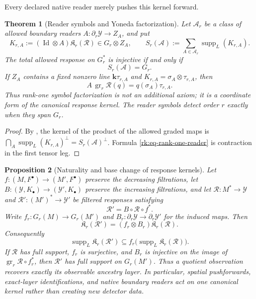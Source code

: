 \documentclass[10pt,reqno]{amsart}
\theoremstyle{plain}
\newtheorem{theorem}{Theorem}[section]
\newtheorem{proposition}[theorem]{Proposition}
\theoremstyle{definition}
\theoremstyle{remark}
\begin{document}
Every declared native reader merely pushes this kernel forward.

\begin{theorem}[Reader symbols and Yoneda factorization]
\label{rk:thm-reader-symbols}
Let $\mathscr A_r$ be a class of allowed boundary readers
$A:\partial_r\mathcal Y\to Z_A$, and put
\[
 K_{r,A}:=(\operatorname{Id}\otimes A)\mathfrak K_r(\mathcal R)
 \in G_r\otimes Z_A,
 \qquad
 S_r(\mathscr A):=
 \sum_{A\in\mathscr A_r}\operatorname{supp}_L(K_{r,A}).
\]
The total allowed response on $G_r^*$ is injective if and only if
\begin{equation}
 S_r(\mathscr A)=G_r.
 \label{rk:eq-reader-support}
\end{equation}
If $Z_A$ contains a fixed nonzero line $\mathbf k\tau_{r,A}$ and
$K_{r,A}=\sigma_A\otimes\tau_{r,A}$, then
\begin{equation}
 A\,\operatorname{gr}_r\mathcal R(q)
 =q(\sigma_A)\tau_{r,A}.
 \label{rk:eq-rank-one-reader}
\end{equation}
Thus rank-one symbol factorization is not an additional axiom; it is a
coordinate form of the canonical response kernel.  The reader symbols detect
order $r$ exactly when they span $G_r$.
\end{theorem}

\begin{proof}
By , the kernel of the product of the allowed
graded maps is
$\bigcap_A\operatorname{supp}_L(K_{r,A})^\perp
=S_r(\mathscr A)^\perp$.  Formula \eqref{rk:eq-rank-one-reader} is contraction
in the first tensor leg.
\end{proof}

\begin{proposition}[Naturality and base change of response kernels]
\label{rk:prop-kernel-naturality}
Let $f:(M,F^\bullet)\to(M',F^\bullet)$ preserve the decreasing
filtrations, let
$B:(\mathcal Y,K_\bullet)\to(\mathcal Y',K_\bullet)$ preserve the
increasing filtrations, and let
$\mathcal R:M^*\to\mathcal Y$ and
$\mathcal R':(M')^*\to\mathcal Y'$ be filtered responses satisfying
\begin{equation}
 \mathcal R'=B\circ\mathcal R\circ f^*.
 \label{rk:eq-response-base-change}
\end{equation}
Write $f_r:G_r(M)\to G_r(M')$ and
$B_r:\partial_r\mathcal Y\to\partial_r\mathcal Y'$ for the induced
maps.  Then
\begin{equation}
 \mathfrak K_r(\mathcal R')
 =(f_r\otimes B_r)\mathfrak K_r(\mathcal R).
 \label{rk:eq-kernel-base-change}
\end{equation}
Consequently
\[
 \operatorname{supp}_L\mathfrak K_r(\mathcal R')
 \subseteq f_r\bigl(\operatorname{supp}_L\mathfrak K_r(\mathcal R)\bigr).
\]
If $\mathcal R$ has full support, $f_r$ is surjective, and $B_r$ is
injective on the image of
$\operatorname{gr}_r\mathcal R\circ f_r^*$, then $\mathcal R'$ has full
support on $G_r(M')$.  Thus a quotient observation recovers exactly its
observable ancestry layer.  In particular, spatial pushforwards,
exact-layer identifications, and native boundary readers act on one canonical
kernel rather than creating new detector data.
\end{proposition}
\end{document}
